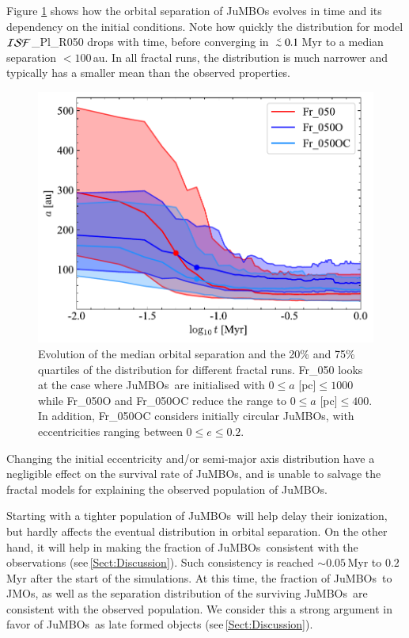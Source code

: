 \documentclass[submission,phys]{lib/SciPost}
\def\aplt{\ {\raise-.5ex\hbox{$\buildrel<\over\sim$}}\ }
\newcommand{\jumbos}{\mbox{JuMBOs}}
\begin{document}
Figure \ref{Fig:sma_vs_time_model_ISF_Fr} shows how the orbital separation 
of JuMBOs evolves in time and its dependency on the initial conditions. 
Note how quickly the distribution for model ${\cal
  ISF}$\_Pl\_R050 drops with time, before converging in $\aplt
0.1$\,Myr to a median separation $<100$\,au.  In all fractal runs, the
distribution is much narrower and typically has a smaller mean than the 
observed properties.

\begin{figure}
  \centering
        \includegraphics[width=0.75\columnwidth]{figures/Fractal_GenObs_sem_evol.pdf}
        \caption{Evolution of the median orbital separation and the
          20\% and 75\% quartiles of the distribution for different
          fractal runs.  Fr\_050 looks at the case where \jumbos\ are
          initialised with $0\leq a$ [pc]$\leq 1000$ while Fr\_050O
          and Fr\_050OC reduce the range to $0\leq a$ [pc]$\leq
          400$. In addition, Fr\_050OC considers initially circular
          JuMBOs, with eccentricities ranging between $0\leq e\leq
          0.2$. }
        \label{Fig:sma_vs_time_model_ISF_Fr}
\end{figure}

Changing the initial eccentricity and/or semi-major axis distribution have a 
negligible effect on the survival rate of JuMBOs, and is unable to salvage 
the fractal models for explaining the observed population of \jumbos.  

Starting with a tighter population of \jumbos\, will help delay their
ionization, but hardly affects the eventual distribution in orbital
separation.  On the other hand, it will help in making the fraction of
\jumbos\, consistent with the observations
(see\,\ref{Sect:Discussion}). Such consistency is reached $\sim
0.05$\,Myr to $0.2$\,Myr after the start of the simulations.  At this
time, the fraction of \jumbos\, to JMOs, as well as the separation
distribution of the surviving \jumbos\, are consistent with the
observed population. We consider this a strong argument in favor of
\jumbos\, as late formed objects (see\,\ref{Sect:Discussion}).
\end{document}
